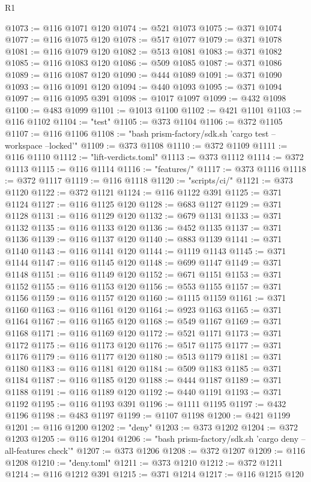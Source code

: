 \begin{lexlean}{R1}
\begin{coremodule}
@1073 := @116 @1071 @120
@1074 := @521 @1073
@1075 := @371 @1074
@1077 := @116 @1075 @120
@1078 := @517 @1077
@1079 := @371 @1078
@1081 := @116 @1079 @120
@1082 := @513 @1081
@1083 := @371 @1082
@1085 := @116 @1083 @120
@1086 := @509 @1085
@1087 := @371 @1086
@1089 := @116 @1087 @120
@1090 := @444 @1089
@1091 := @371 @1090
@1093 := @116 @1091 @120
@1094 := @440 @1093
@1095 := @371 @1094
@1097 := @116 @1095 @391
@1098 := @1017 @1097
@1099 := @432 @1098
@1100 := @483 @1099
@1101 := @1013 @1100
@1102 := @421 @1101
@1103 := @116 @1102
@1104 := "test"
@1105 := @373 @1104
@1106 := @372 @1105
@1107 := @116 @1106
@1108 := "bash prism-factory/sdk.sh 'cargo test --workspace --locked'"
@1109 := @373 @1108
@1110 := @372 @1109
@1111 := @116 @1110
@1112 := "lift-verdicts.toml"
@1113 := @373 @1112
@1114 := @372 @1113
@1115 := @116 @1114
@1116 := "features/"
@1117 := @373 @1116
@1118 := @372 @1117
@1119 := @116 @1118
@1120 := "scripts/ci/"
@1121 := @373 @1120
@1122 := @372 @1121
@1124 := @116 @1122 @391
@1125 := @371 @1124
@1127 := @116 @1125 @120
@1128 := @683 @1127
@1129 := @371 @1128
@1131 := @116 @1129 @120
@1132 := @679 @1131
@1133 := @371 @1132
@1135 := @116 @1133 @120
@1136 := @452 @1135
@1137 := @371 @1136
@1139 := @116 @1137 @120
@1140 := @883 @1139
@1141 := @371 @1140
@1143 := @116 @1141 @120
@1144 := @1119 @1143
@1145 := @371 @1144
@1147 := @116 @1145 @120
@1148 := @699 @1147
@1149 := @371 @1148
@1151 := @116 @1149 @120
@1152 := @671 @1151
@1153 := @371 @1152
@1155 := @116 @1153 @120
@1156 := @553 @1155
@1157 := @371 @1156
@1159 := @116 @1157 @120
@1160 := @1115 @1159
@1161 := @371 @1160
@1163 := @116 @1161 @120
@1164 := @923 @1163
@1165 := @371 @1164
@1167 := @116 @1165 @120
@1168 := @549 @1167
@1169 := @371 @1168
@1171 := @116 @1169 @120
@1172 := @521 @1171
@1173 := @371 @1172
@1175 := @116 @1173 @120
@1176 := @517 @1175
@1177 := @371 @1176
@1179 := @116 @1177 @120
@1180 := @513 @1179
@1181 := @371 @1180
@1183 := @116 @1181 @120
@1184 := @509 @1183
@1185 := @371 @1184
@1187 := @116 @1185 @120
@1188 := @444 @1187
@1189 := @371 @1188
@1191 := @116 @1189 @120
@1192 := @440 @1191
@1193 := @371 @1192
@1195 := @116 @1193 @391
@1196 := @1111 @1195
@1197 := @432 @1196
@1198 := @483 @1197
@1199 := @1107 @1198
@1200 := @421 @1199
@1201 := @116 @1200
@1202 := "deny"
@1203 := @373 @1202
@1204 := @372 @1203
@1205 := @116 @1204
@1206 := "bash prism-factory/sdk.sh 'cargo deny --all-features check'"
@1207 := @373 @1206
@1208 := @372 @1207
@1209 := @116 @1208
@1210 := "deny.toml"
@1211 := @373 @1210
@1212 := @372 @1211
@1214 := @116 @1212 @391
@1215 := @371 @1214
@1217 := @116 @1215 @120

\end{coremodule}
\end{lexlean}
